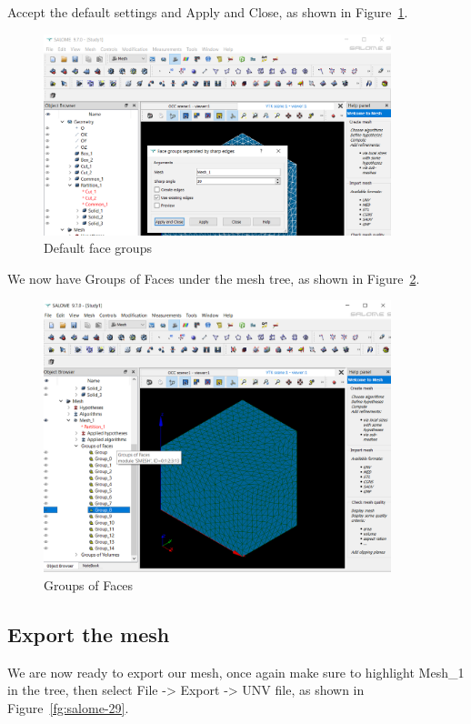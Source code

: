 Accept the default settings and Apply and Close, as shown in Figure~\ref{fg:salome-27}.

\begin{figure}[H]
\centering
\includegraphics[width=0.9\textwidth]{Salome-27}
\caption{Default face groups}\label{fg:salome-27}
\end{figure}

We now have Groups of Faces under the mesh tree, as shown in Figure~\ref{fg:salome-28}.

\begin{figure}[H]
\centering
\includegraphics[width=0.9\textwidth]{Salome-28}
\caption{Groups of Faces}\label{fg:salome-28}
\end{figure}

\subsection{Export the mesh}

We are now ready to export our mesh, once again make sure to highlight Mesh\_1 in the tree, then select File -> Export -> UNV file, as shown in Figure~\ref{fg:salome-29}.

